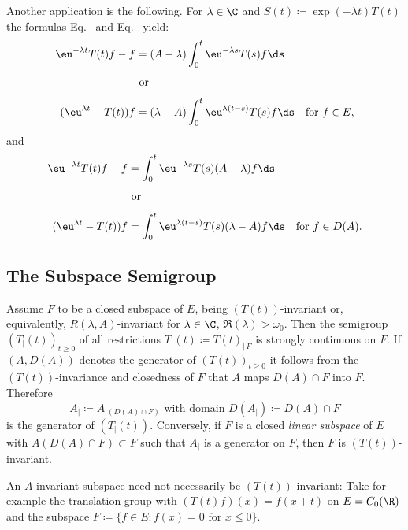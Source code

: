 Another application is the following.
For $\lambda \in \C$ and $S(t) \coloneqq \exp(-\lambda t)T(t)$ the formulas Eq.~ and Eq.~ yield:
\begin{equation}\label{eq:a1-3.1}
\begin{split}
     \eu^{-\lambda t}T(t)f - f &= (A-\lambda) \int_{0}^{t}  \eu^{-\lambda s}T(s)f \ds \\[4pt]
     & \text{ or } \\[4pt]
    ( \eu^{\lambda t}-T(t))f &= (\lambda-A) \int_{0}^{t}  \eu^{\lambda(t-s)}T(s)f \ds \quad \text{for } f \in E,  
\end{split}
\end{equation}
and
\begin{equation}\label{eq:a1-3.2}
\begin{split}
     \eu^{-\lambda t}T(t)f - f &= \int_{0}^{t}  \eu^{-\lambda s}T(s)(A-\lambda)f \ds \\[4pt]
     & \text{ or } \\[4pt]
    ( \eu^{\lambda t} - T(t))f &= \int_{0}^{t}  \eu^{\lambda(t-s)}T(s)(\lambda-A)f \ds \quad \text{for } f \in D(A).  
\end{split}
\end{equation}
\subsection{The Subspace Semigroup}\label{subsec:a1-3.3}%
Assume $F$ to be a closed subspace of\/ $E$, being $(T(t))$-invariant or, equivalently, $R(\lambda,A)$-invariant for 
$\lambda \in \C$, $ \Re(\lambda) > \omega_{0}$.
Then the semigroup $(T_{|}(t))_{t \geq 0}$ of all restrictions $T_{|}(t) \coloneqq T(t)_{|\,F}$ is strongly continuous on $F$.
If\/ $(A,D(A))$ denotes the generator of\/ $(T(t))_{t \geq 0}$ it follows from the $(T(t))$-invariance and closedness of\/ $F$ that $A$ maps $D(A) \cap F$ into $F$.
Therefore
\[
    A_{|} \coloneqq A_{| (D(A)\cap F)} \text{ with domain } D(A_{|}) \coloneqq D(A) \cap F
\]
is the generator of\/ $(T_{|}(t))$.
%
Conversely, if\/ $F$ is a closed \emph{linear subspace} of\/ $E$ with $A(D(A) \cap F) \subset F$ such that 
$A_{|}$ is a generator on $F$, then $F$ is $(T(t))$-invariant.

An $A$-invariant subspace need not necessarily be $(T(t))$-invariant:
Take for example the translation group with $(T(t)f)(x) = f(x+t)$ on $E = C_{0}(\R)$ and the subspace $F \coloneqq \{f \in E \colon f(x) = 0 \text{ for } x \leq 0\}$.
